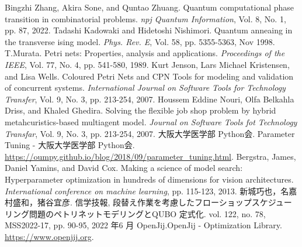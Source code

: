\def\line{−\hspace*{-.7zw}−}

\begin{thebibliography}{99}

 Bingzhi Zhang, Akira Sone, and Quntao Zhuang. Quantum computational phase transition in combinatorial problems. \textit{npj Quantum Information}, Vol. 8, No. 1, pp. 87, 2022.
 Tadashi Kadowaki and Hidetoshi Nishimori. Quantum anneaing in the transverse ising model. \textit{Phys. Rev. E}, Vol. 58, pp. 5355-5363, Nov 1998.
 T.Murata. Petri nets: Properties, analysis and applications. \textit{Proceedings of the IEEE}, Vol. 77, No. 4, pp. 541-580, 1989.
 Kurt Jenson, Lars Michael Kristensen, and Lisa Wells. Coloured Petri Nets and CPN Tools for modeling and validation of concurrent systems. \textit{International Journal on Software Tools for Technology Transfer}, Vol. 9, No. 3, pp. 213-254, 2007.
 Houssem Eddine Nouri, Olfa Belkahla Driss, and Khaled Ghedira. Solving the flexible job shop problem by hybrid metahcuristics-based multiagent model. \textit{Journal on Software Tools fot Technology Transfar}, Vol. 9, No. 3, pp. 213-254, 2007.
 大阪大学医学部 Python会. Parameter Tuning - 大阪大学医学部 Python会. \url{https://oumpy.github.io/blog/2018/09/parameter_tuning.html}.
 Bergstra, James, Daniel Yamins, and David Cox. Making a science of model search: Hyperparameter optimization in hundreds of dimensions for vision architectures. \textit{International conference on machine learning}, pp. 115-123, 2013.
 新城巧也，名嘉村盛和，猪谷宜彦. 信学技報, 段替え作業を考慮したフローショップスケジューリング問題のペトリネットモデリングとQUBO 定式化. vol. 122, no. 78, MSS2022-17, pp. 90-95, 2022 年6 月
 OpenJij.OpenJij - Optimization Library. \url{https://www.openjij.org}.

\end{thebibliography}
